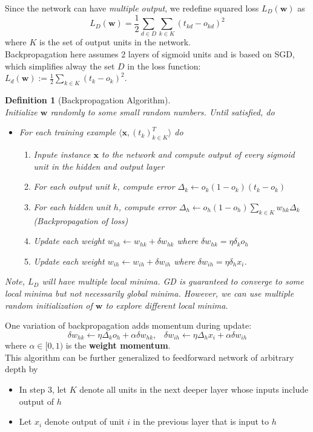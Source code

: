 \documentclass[12pt]{article}
\newtheorem{definition}{Definition}[section]
\theoremstyle{definition}
\begin{document}
Since the network can have \textit{multiple output}, we redefine squared loss $L_D(\mathbf{w})$ as
\[
L_D(\mathbf{w})=\frac{1}{2}\sum_{d\in D}\sum_{k\in K}(t_{kd}-o_{kd})^2
\]
where $K$ is the set of output units in the network.\\
Backpropagation here assumes 2 layers of sigmoid units and is based on SGD, which simplifies alway the set $D$ in the loss function: $L_d(\mathbf{w}):=\frac{1}{2}\sum_{k\in K}(t_k-o_k)^2$.
\begin{definition}[Backpropagation Algorithm]
\hfill\\\normalfont 
Initialize $\mathbf{w}$ randomly to some small random numbers. Until satisfied, do
\begin{itemize}
	\item For each training example $\langle \mathbf{x}, (t_k)_{k\in K}^T\rangle$ do
	\begin{enumerate}
		\item Inpute instance $\mathbf{x}$ to the network and compute output of every sigmoid unit in the hidden and output layer
		\item For each output unit $k$, compute error $\Delta_k\leftarrow o_k(1-o_k)(t_k-o_k)$
		\item For each hidden unit $h$, compute error $\Delta_h\leftarrow o_h(1-o_h)\sum_{k\in K}w_{hk}\Delta_k$ (Backpropagation of loss)
		\item Update each weight $w_{hk}\leftarrow w_{hk}+\delta w_{hk}$ where $\delta w_{hk}=\eta \delta_k o_h$
		\item Update each weight $w_{ih}\leftarrow w_{ih}+\delta w_{ih}$ where $\delta w_{ih}=\eta \delta_h x_i$. 
	\end{enumerate}
\end{itemize}
Note, $L_D$ will have multiple \textit{local minima}. GD is guaranteed to converge to some local minima but not necessarily global minima. However, we can use \textit{multiple} random initialization of $\mathbf{w}$ to explore different local minima.
\end{definition}
One variation of backpropagation adds momentum during update:
\[
\delta w_{hk}\leftarrow \eta\Delta_ko_h+\alpha\delta w_{hk}, \;\;\;\delta w_{ih}\leftarrow \eta\Delta_hx_i+\alpha\delta w_{ih}
\]
where $\alpha\in[0,1)$ is the \textbf{weight momentum}.\\
This algorithm can be further generalized to feedforward network of arbitrary depth by
\begin{itemize}
	\item In step 3, let $K$ denote all units in the next deeper layer whose inputs include output of $h$
	\item Let $x_i$ denote output of unit $i$ in the previous layer that is input to $h$
\end{itemize}
\end{document}
